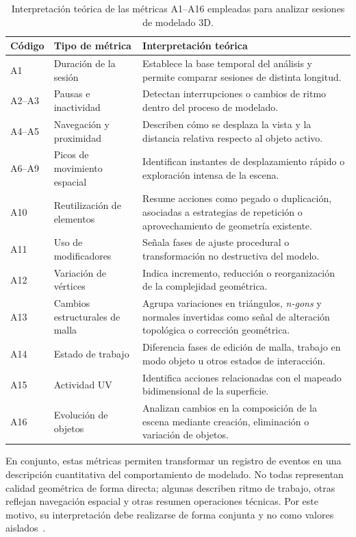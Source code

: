 \begin{table}[H]
\centering
\small
\begin{tabularx}{\textwidth}{p{}p{}X}
\toprule
\textbf{Código} & \textbf{Tipo de métrica} & \textbf{Interpretación teórica} \\
\midrule
A1 & Duración de la sesión & Establece la base temporal del análisis y permite comparar sesiones de distinta longitud. \\
A2--A3 & Pausas e inactividad & Detectan interrupciones o cambios de ritmo dentro del proceso de modelado. \\
A4--A5 & Navegación y proximidad & Describen cómo se desplaza la vista y la distancia relativa respecto al objeto activo. \\
A6--A9 & Picos de movimiento espacial & Identifican instantes de desplazamiento rápido o exploración intensa de la escena. \\
A10 & Reutilización de elementos & Resume acciones como pegado o duplicación, asociadas a estrategias de repetición o aprovechamiento de geometría existente. \\
A11 & Uso de modificadores & Señala fases de ajuste procedural o transformación no destructiva del modelo. \\
A12 & Variación de vértices & Indica incremento, reducción o reorganización de la complejidad geométrica. \\
A13 & Cambios estructurales de malla & Agrupa variaciones en triángulos, \textit{n-gons} y normales invertidas como señal de alteración topológica o corrección geométrica. \\
A14 & Estado de trabajo & Diferencia fases de edición de malla, trabajo en modo objeto u otros estados de interacción. \\
A15 & Actividad UV & Identifica acciones relacionadas con el mapeado bidimensional de la superficie. \\
A16 & Evolución de objetos & Analizan cambios en la composición de la escena mediante creación, eliminación o variación de objetos. \\
\bottomrule
\end{tabularx}
\caption{Interpretación teórica de las métricas A1--A16 empleadas para analizar sesiones de modelado 3D.}
\label{tab:metricas_teoricas_a1_a17}
\end{table}

En conjunto, estas métricas permiten transformar un registro de eventos en una descripción cuantitativa del comportamiento de modelado. No todas representan calidad geométrica de forma directa; algunas describen ritmo de trabajo, otras reflejan navegación espacial y otras resumen operaciones técnicas. Por este motivo, su interpretación debe realizarse de forma conjunta y no como valores aislados~\cite{gao2023}.

